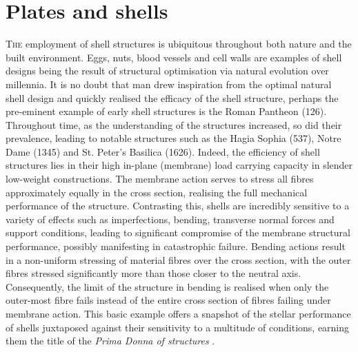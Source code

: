 




\chapter{Plates and shells}
\label{chap:chapter_2}

\renewcommand{\Thema}{Plates and shells}

\lettrine[lines=3]{T}{he} employment of shell structures is ubiquitous throughout both nature and the built environment. Eggs, nuts, blood vessels and cell walls are examples of shell designs being the result of structural optimisation via natural evolution over millennia. It is no doubt that man drew inspiration from the optimal natural shell design and quickly realised the efficacy of the shell structure, perhaps the pre-eminent example of early shell structures is the Roman Pantheon (126).  Throughout time, as the understanding of the structures increased, so did their prevalence, leading to notable structures such as the Hagia Sophia (537), Notre Dame (1345) and St. Peter's Basilica (1626). Indeed, the efficiency of shell structures lies in their high in-plane (membrane) load carrying capacity in slender low-weight constructions. The membrane action serves to stress all fibres approximately equally in the cross section, realising the full mechanical performance of the structure. Contrasting this, shells are incredibly sensitive to a variety of effects such as imperfections, bending, transverse normal forces and support conditions, leading to significant compromise of the membrane structural performance, possibly manifesting in catastrophic failure. Bending actions result in a non-uniform stressing of material fibres over the cross section, with the outer fibres stressed significantly more than those closer to the neutral axis. Consequently, the limit of the structure in bending is realised when only the outer-most fibre fails instead of the entire cross section of fibres failing under membrane action. This basic example offers a snapshot of the stellar performance of shells juxtaposed against their sensitivity to a multitude of conditions, earning them the title of the \textit{Prima Donna of structures} \cite{Ram16}.

